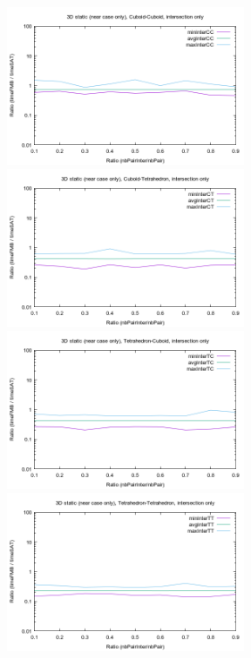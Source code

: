 \documentclass[12pt, a4paper]{article}
\begin{document}
\begin{center}
\begin{figure}[H]
\centering\includegraphics[width=7cm]{../Results/qualification3DCCinterNearCaseOnly.png}
\centering\includegraphics[width=7cm]{../Results/qualification3DCTinterNearCaseOnly.png}
\centering\includegraphics[width=7cm]{../Results/qualification3DTCinterNearCaseOnly.png}
\centering\includegraphics[width=7cm]{../Results/qualification3DTTinterNearCaseOnly.png}
\end{figure}
\end{center}
\end{document}
